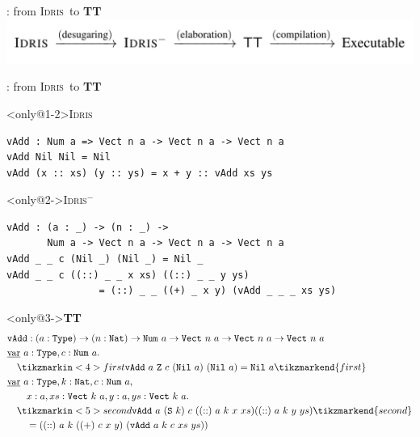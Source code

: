 \documentclass{beamer}
\newcommand\Idris{\textsc{Idris}}
\begin{document}
\begin{frame}{\typetheory: from \Idris\ to \textbf{TT}}
    \includegraphics[width=\textwidth]{phases}
\end{frame}

\begin{frame}[fragile]{\typetheory: from \Idris\ to \textbf{TT}}
    \begin{block}<only@1-2>{\Idris}
        \begin{lstlisting}[basicstyle=\ttfamily\scriptsize]
vAdd : Num a => Vect n a -> Vect n a -> Vect n a
vAdd Nil Nil = Nil
vAdd (x :: xs) (y :: ys) = x + y :: vAdd xs ys
        \end{lstlisting}
    \end{block}
    \vfill

    \begin{block}<only@2->{\Idris$^-$}
    \begin{lstlisting}[basicstyle=\ttfamily\scriptsize]
vAdd : (a : _) -> (n : _) ->
       Num a -> Vect n a -> Vect n a -> Vect n a
vAdd _ _ c (Nil _) (Nil _) = Nil _
vAdd _ _ c ((::) _ _ x xs) ((::) _ _ y ys)
                = (::) _ _ ((+) _ x y) (vAdd _ _ _ xs ys)
    \end{lstlisting}
    \end{block}

    \vfill

    \newcommand\vAdd{\texttt{vAdd}}
    \newcommand\Type{\texttt{Type}}
    \newcommand\Nat{\texttt{Nat}}
    \newcommand\Num{\texttt{Num}}
    \newcommand\Vect{\texttt{Vect}}
    \newcommand\Nil{\texttt{Nil}}

    \begin{block}<only@3->{\textbf{TT}}
    \footnotesize{
        \begin{align*}
            & \vAdd : (a : \Type) \to (n : \Nat) \to \Num\ a \to \Vect\ n\ a \to \Vect\ n\ a \to \Vect\ n\ a \\
            & \ttvar\ a : \Type, c : \Num\ a. \\
            & \quad \tikzmarkin<4>{first}\vAdd\ a\ \texttt{Z}\ c\ (\Nil\ a)\ (\Nil\ a) = \Nil\ a \tikzmarkend{first} \\
            & \ttvar\ a : \Type, k : \Nat, c : \Num\ a, \\
            & \quad \quad x : a, xs : \Vect\ k\ a, y : a, ys : \Vect\ k\ a. \\
            & \quad \tikzmarkin<5>{second}\vAdd\ a\ (\texttt{S}\ k)\ c\ ((::)\ a\ k\ x\ xs) ((::)\ a\ k\ y\ ys)\tikzmarkend{second} \\
            & \quad \quad = ((::)\ a\ k\ ((+)\ c\ x\ y)\ (\vAdd\ a\ k\ c\ xs\ ys)) \\
        \end{align*}
    }
    \end{block}
\end{frame}
\end{document}
